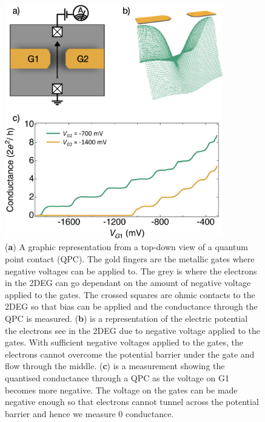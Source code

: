 \begin{figure}[!htb]
  \begin{center}
    \includegraphics[width=0.85\textwidth]{figures/ch1/crop_FiguresMaster.003.png}
    \caption[Conductance through a quantum point contact]{\label{fig:ch1/qpc_intro} 
    (\textbf{a}) A graphic representation from a top-down view of a quantum point contact (QPC). The gold fingers are the metallic gates where negative voltages can be applied to. The grey is where the electrons in the 2DEG can go dependant on the amount of negative voltage applied to the gates. The crossed squares are ohmic contacts to the 2DEG so that bias can be applied and the conductance through the QPC is measured. (\textbf{b}) is a representation of the electric potential the electrons see in the 2DEG due to negative voltage applied to the gates. With sufficient negative voltages applied to the gates, the electrons cannot overcome the potential barrier under the gate and flow through the middle. (\textbf{c}) is a measurement showing the quantised conductance through a QPC as the voltage on G1 becomes more negative. The voltage on the gates can be made negative enough so that electrons cannot tunnel across the potential barrier and hence we measure 0 conductance. 
      }
  \end{center}
\end{figure}

